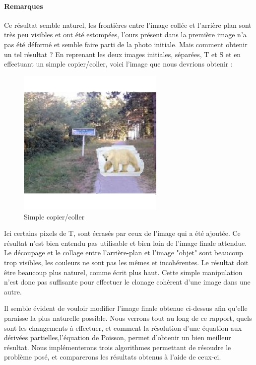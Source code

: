\paragraph{Remarques}
Ce résultat semble naturel, les frontières entre l'image collée et l'arrière plan sont très peu visibles et ont été estompées, l'ours présent dans la première image n'a pas été déformé et semble faire parti de la photo initiale. 
Mais comment obtenir un tel résultat ?
\newline
En reprenant les deux images initiales, séparées, T et S et en effectuant un simple copier/coller, voici l'image que nous devrions obtenir : 
\begin{center}
\begin{figure}[H]
     \centering
     \includegraphics[width = 200pt]{beamIm/cccv.png}
     \caption{Simple copier/coller}
\end{figure}
\end{center}
Ici certains pixels de T, sont écrasés par ceux de l'image qui a été ajoutée. Ce résultat n'est bien entendu pas utilisable et bien loin de l'image finale attendue. Le découpage et le collage entre l'arrière-plan et l'image "objet" sont beaucoup trop visibles, les couleurs ne sont pas les mêmes et incohérentes. Le résultat doit être beaucoup plus naturel, comme écrit plus haut. Cette simple manipulation n'est donc pas suffisante pour effectuer le clonage cohérent  d'une image dans une autre. \newline

Il semble évident de vouloir modifier l'image finale obtenue ci-dessus afin qu'elle paraisse la plus naturelle possible.
Nous verrons tout au long de ce rapport, quels sont les changements à effectuer, et comment la résolution d'une équation aux dérivées partielles,l'équation de Poisson, permet d'obtenir un bien meilleur résultat. Nous implémenterons trois algorithmes permettant de résoudre le problème posé, et comparerons les résultats obtenus à l'aide de ceux-ci.

